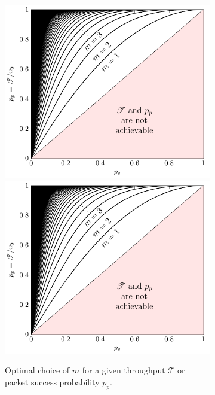 \begin{figure}[htb]
    \begin{subfigure}{.05\textwidth}
        \hspace{.05\textwidth}
    \end{subfigure}%
    \begin{subfigure}[t]{.45\textwidth}
      \centering
        \if{}
            \includegraphics[width=\columnwidth]{Figures/Ch6_opt_m_v2.pdf}
        \else
            \includegraphics[draft,width=\columnwidth]{Figures/Ch6_opt_m_v2.pdf}
        \fi
        \caption{Optimal choice of $m$ for a given throughput $\mathscr{T}$ or packet success probability $p_p$.}
        \label{fig:opt_m_v2}
    \end{subfigure}
    \caption{}
\end{figure}

